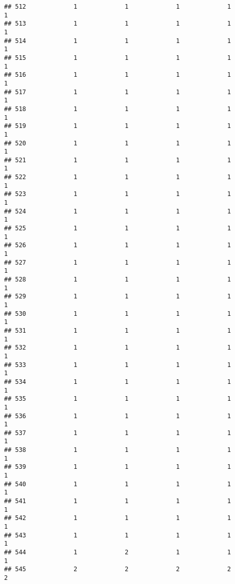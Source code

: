 \documentclass[
]{article}
\begin{document}
\begin{verbatim}
## 512             1             1             1             1             1
## 513             1             1             1             1             1
## 514             1             1             1             1             1
## 515             1             1             1             1             1
## 516             1             1             1             1             1
## 517             1             1             1             1             1
## 518             1             1             1             1             1
## 519             1             1             1             1             1
## 520             1             1             1             1             1
## 521             1             1             1             1             1
## 522             1             1             1             1             1
## 523             1             1             1             1             1
## 524             1             1             1             1             1
## 525             1             1             1             1             1
## 526             1             1             1             1             1
## 527             1             1             1             1             1
## 528             1             1             1             1             1
## 529             1             1             1             1             1
## 530             1             1             1             1             1
## 531             1             1             1             1             1
## 532             1             1             1             1             1
## 533             1             1             1             1             1
## 534             1             1             1             1             1
## 535             1             1             1             1             1
## 536             1             1             1             1             1
## 537             1             1             1             1             1
## 538             1             1             1             1             1
## 539             1             1             1             1             1
## 540             1             1             1             1             1
## 541             1             1             1             1             1
## 542             1             1             1             1             1
## 543             1             1             1             1             1
## 544             1             2             1             1             1
## 545             2             2             2             2             2

\end{verbatim}
\end{document}
